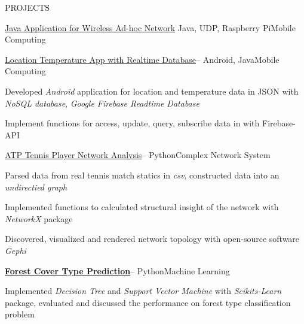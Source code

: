 \documentclass{resume} %
\begin{document}
\begin{rSection}{PROJECTS}
\begin{rSubsection}{\href{https://github.com/kuangyu0801/MobileComputing_SS20_assign04}{Java Application for Wireless Ad-hoc Network}} {Java, UDP, Raspberry Pi}{Mobile Computing}{}
\end{rSubsection}
\begin{rSubsection}{\href{https://github.com/kuangyu0801/MobileComputing_SS20_assign03}{Location Temperature App with Realtime Database}}{-- Android, Java}{Mobile Computing}{}
\item Developed {\em Android} application for location and temperature data in JSON with {\em NoSQL database}, {\em Google Firebase Readtime Database}
\item Implement functions for access, update, query, subscribe data in  with Firebase-API
\end{rSubsection}
\begin{rSubsection}{\href{https://github.com/kuangyu0801/WS19_ComplexNetworkSystem}{ATP Tennis Player Network Analysis}}{-- Python}{Complex Network System}{}
\item Parsed data  from real tennis match statics in {\em csv}, constructed data into an {\em undirectied graph}
\item Implemented functions to calculated structural insight of the network with {\em NetworkX} package
\item Discovered, visualized and rendered network topology with open-source software {\em Gephi}
\end{rSubsection}

\begin{rSubsection}{\bf \href{https://1drv.ms/p/s!AiukWIzY5GZp22FjndnKscnEaL85?e=F2UJEL}{Forest Cover Type Prediction}}{-- Python}{Machine Learning}{}
\item Implemented {\em Decision Tree} and {\em Support Vector Machine} with {\em Scikits-Learn} package, evaluated and discussed the performance on forest type classification problem 

\end{rSubsection}

\end{rSection}







\end{document}
